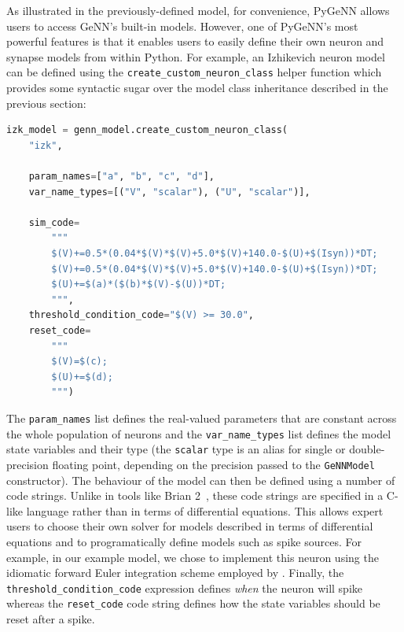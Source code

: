 \documentclass[utf8]{frontiersSCNS} %
\begin{document}
As illustrated in the previously-defined model, for convenience, PyGeNN allows users to access GeNN's built-in models.
However, one of PyGeNN's most powerful features is that it enables users to easily define their own neuron and synapse models from within Python.
For example, an Izhikevich neuron model~\citep{Izhikevich2003a} can be defined using the \lstinline{create_custom_neuron_class} helper function which provides some syntactic sugar over the model class inheritance described in the previous section:
%
\begin{lstlisting}[language=Python]
izk_model = genn_model.create_custom_neuron_class(
    "izk",

    param_names=["a", "b", "c", "d"],
    var_name_types=[("V", "scalar"), ("U", "scalar")],

    sim_code=
        """
        $(V)+=0.5*(0.04*$(V)*$(V)+5.0*$(V)+140.0-$(U)+$(Isyn))*DT;
        $(V)+=0.5*(0.04*$(V)*$(V)+5.0*$(V)+140.0-$(U)+$(Isyn))*DT;
        $(U)+=$(a)*($(b)*$(V)-$(U))*DT;
        """,
    threshold_condition_code="$(V) >= 30.0",
    reset_code=
        """
        $(V)=$(c);
        $(U)+=$(d);
        """)
\end{lstlisting}
%
The \lstinline{param_names} list defines the real-valued parameters that are constant across the whole population of neurons and the \lstinline{var_name_types} list defines the model state variables and their type (the \lstinline{scalar} type is an alias for single or double-precision floating point, depending on the precision passed to the \lstinline{GeNNModel} constructor).
The behaviour of the model can then be defined using a number of code strings.
Unlike in tools like Brian 2~\citep{Stimberg2019}, these code strings are specified in a C-like language rather than in terms of differential equations.
This allows expert users to choose their own solver for models described in terms of differential equations and to programatically define models such as spike sources.
For example, in our example model, we chose to implement this neuron using the idiomatic forward Euler integration scheme employed by \citet{Izhikevich2003a}.
Finally, the \lstinline{threshold_condition_code} expression defines \emph{when} the neuron will spike whereas the \lstinline{reset_code} code string defines how the state variables should be reset after a spike.
\end{document}
